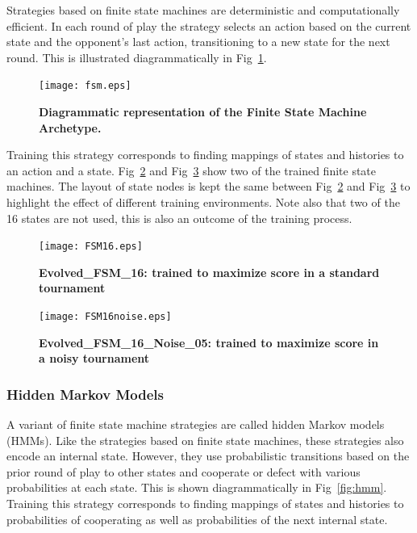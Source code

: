 \documentclass[10pt,letterpaper]{article}
\begin{document}
Strategies based on finite state machines are deterministic and computationally efficient.
In each round of play the strategy selects an action based on the current state
and the opponent's last action, transitioning to a new state for the next round.
This is illustrated diagrammatically in Fig~\ref{fig:fsm}.

\begin{figure}[!hbtp]
    \centering
    \texttt{[image: fsm.eps]}
    \caption{\bf Diagrammatic representation of the Finite State Machine Archetype.}
    \label{fig:fsm}
\end{figure}

Training this strategy corresponds to finding mappings of states and histories
to an action and a state. Fig~\ref{fig:fsm16} and Fig~\ref{fig:fsm16noise} show
two of the trained
finite state machines. The layout of state nodes is kept the same between
Fig~\ref{fig:fsm16} and Fig~\ref{fig:fsm16noise} to highlight the effect of
different training environments. Note also that two of the 16 states are not
used, this is also an outcome of the training process.


\begin{figure}[!hbtp]
    \centering
        \texttt{[image: FSM16.eps]}
        \caption{\bf Evolved\_FSM\_16: trained to maximize score in a standard
        tournament}
        \label{fig:fsm16}
\end{figure}

\begin{figure}
        \centering
        \texttt{[image: FSM16noise.eps]}
        \caption{\bf Evolved\_FSM\_16\_Noise\_05: trained to maximize score in a
        noisy tournament}
        \label{fig:fsm16noise}
\end{figure}


\subsubsection*{Hidden Markov Models}\label{sec:hmm}

A variant of finite state machine strategies are called hidden Markov models
(HMMs). Like the strategies based on finite state machines, these strategies
also encode an internal state. However, they use probabilistic transitions based on the
prior round of play to other states and cooperate or defect with various
probabilities at each state. This is
shown diagrammatically in Fig~\ref{fig:hmm}. Training this strategy
corresponds to finding mappings of states and histories to probabilities of
cooperating as well as probabilities of the next internal state.
\end{document}

